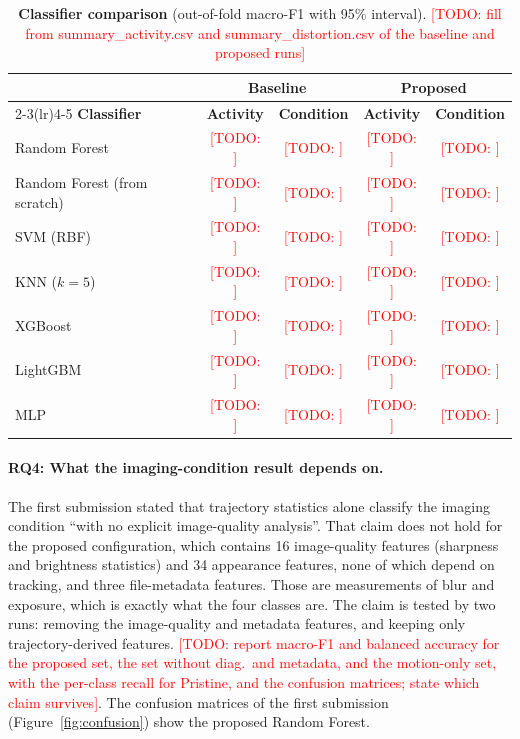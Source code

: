 \documentclass[runningheads]{llncs}
\newcommand{\todo}[1]{\textcolor{red}{[TODO: #1]}}
\begin{document}
\begin{table}[htbp]
\centering
\caption{\textbf{Classifier comparison} (out-of-fold macro-F1 with 95\% interval). \todo{fill from summary\_activity.csv and summary\_distortion.csv of the baseline and proposed runs}}
\label{tab:classifiers}
\fontsize{8}{9.6}\selectfont
\begin{tabular}{lcccc}
\toprule
& \multicolumn{2}{c}{\textbf{Baseline}} & \multicolumn{2}{c}{\textbf{Proposed}} \\
\cmidrule(lr){2-3}\cmidrule(lr){4-5}
\textbf{Classifier} & \textbf{Activity} & \textbf{Condition} & \textbf{Activity} & \textbf{Condition} \\
\midrule
Random Forest & \todo{} & \todo{} & \todo{} & \todo{} \\
Random Forest (from scratch) & \todo{} & \todo{} & \todo{} & \todo{} \\
SVM (RBF) & \todo{} & \todo{} & \todo{} & \todo{} \\
KNN ($k{=}5$) & \todo{} & \todo{} & \todo{} & \todo{} \\
XGBoost & \todo{} & \todo{} & \todo{} & \todo{} \\
LightGBM & \todo{} & \todo{} & \todo{} & \todo{} \\
MLP & \todo{} & \todo{} & \todo{} & \todo{} \\
\bottomrule
\end{tabular}
\end{table}

\paragraph{RQ4: What the imaging-condition result depends on.}

The first submission stated that trajectory statistics alone classify the imaging condition ``with no
explicit image-quality analysis''. That claim does not hold for the proposed configuration, which contains
16 image-quality features (sharpness and brightness statistics) and 34 appearance features, none of
which depend on tracking, and three file-metadata features. Those are measurements of blur and exposure,
which is exactly what the four classes are. The claim is tested by two runs: removing the image-quality
and metadata features, and keeping only trajectory-derived features. \todo{report macro-F1 and balanced
accuracy for the proposed set, the set without diag.\ and metadata, and the motion-only set, with the
per-class recall for Pristine, and the confusion matrices; state which claim survives}. The confusion
matrices of the first submission (Figure~\ref{fig:confusion}) show the proposed Random Forest.
\end{document}

